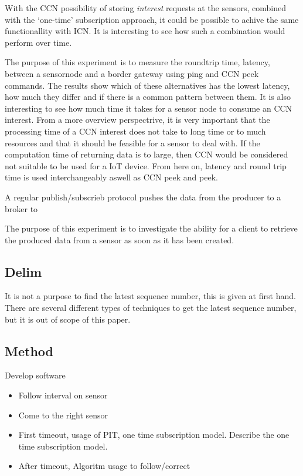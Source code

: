 With the CCN possibility of storing \textit{interest} requests at the sensors, combined with the `one-time' subscription approach, it could be possible to achive the same functionallity with ICN. It is interesting to see how such a combination would perform over time. 



The purpose of this experiment is to measure the roundtrip time, latency, between a sensornode and a border gateway using ping and CCN peek commands. The results show which of these alternatives has the lowest latency, how much they differ and if there is a common pattern between them. It is also interesting to see how much time it takes for a sensor node to consume an CCN interest. From a more overview perspectrive, it is very important that the processing time of a CCN interest does not take to long time or to much resources and that it should be feasible for a sensor to deal with. If the computation time of returning data is to large, then CCN would be considered not suitable to be used for a IoT device. From here on, latency and round trip time is used interchangeably aswell as CCN peek and peek.

A regular publish/subscrieb protocol pushes the data from the producer to a broker to 


The purpose of this experiment is to investigate the ability for a client to retrieve the produced data from a sensor as soon as it has been created. 


\subsection{Delim}
It is not a purpose to find the latest sequence number, this is given at first hand. There are several different types of techniques to get the latest sequence number, but it is out of scope of this paper. 


\subsection{Method}
Develop software

\begin{itemize}
\item Follow interval on sensor
\item Come to the right sensor
\item First timeout, usage of PIT, one time subscription model. Describe the one time subscription model.
\item After timeout, Algoritm usage to follow/correct

\end{itemize}

